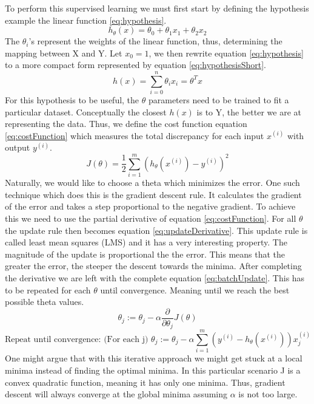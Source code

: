 \documentclass{mproj}
\begin{document}
To perform this supervised learning we must first start by defining the hypothesis example the linear function \ref{eq:hypothesis}.
\begin{equation}
\label{eq:hypothesis}
h_\theta(x) = \theta_0 + \theta_1x_1 + \theta_2x_2
\end{equation}
The $\theta_i$'s represent the weights of the linear function, thus, determining the mapping between X and Y. Let $x_0=1$, we then rewrite equation \ref{eq:hypothesis} to a more compact form represented by equation \ref{eq:hypothesisShort}.
\begin{equation}
\label{eq:hypothesisShort}
h(x) = \sum_{i=0}^{n} \theta_ix_i = \theta^Tx
\end{equation}
For this hypothesis to be useful, the $\theta$ parameters need to be trained to fit a particular dataset. Conceptually the closest $h(x)$ is to Y, the better we are at representing the data. Thus, we define the cost function equation \ref{eq:costFunction} which measures the total discrepancy for each input $x^{(i)}$ with output $y^{(i)}$.
\begin{equation}
\label{eq:costFunction}
J(\theta) = \frac{1}{2}\sum_{i=1}^{m}( h_\theta(x^{(i)})-y^{(i)})^2
\end{equation}
Naturally, we would like to choose a theta which minimizes the error. One such technique which does this is the gradient descent rule. It calculates the gradient of the error and takes a step proportional to the negative gradient. To achieve this we need to use the partial derivative of equation \ref{eq:costFunction}. For all $\theta$ the update rule then becomes equation \ref{eq:updateDerivative}. This update rule is called least mean squares (LMS) and it has a very interesting property. The magnitude of the update is proportional the the error. This means that the greater the error, the steeper the descent towards the minima.  After completing the derivative we are left with the complete equation \ref{eq:batchUpdate}. This has to be repeated for each $\theta$ until convergence. Meaning until we reach the best possible theta values.
\begin{equation}
\label{eq:updateDerivative}
\theta_j := \theta_j - \alpha\frac{\partial}{\partial\theta_j}J(\theta)
\end{equation}
\begin{equation}
\label{eq:batchUpdate}
\text{Repeat until convergence: (For each j) }
\theta_j := \theta_j - \alpha\sum_{i=1}^{m}(y^{(i)}-h_\theta(x^{(i)}))x_j^{(i)}
\end{equation}
One might argue that with this iterative approach we might get stuck at a local minima instead of finding the optimal minima. In this particular scenario J is a convex quadratic function, meaning it has only one minima. Thus, gradient descent will always converge at the global minima assuming $\alpha$ is not too large.
\end{document}
